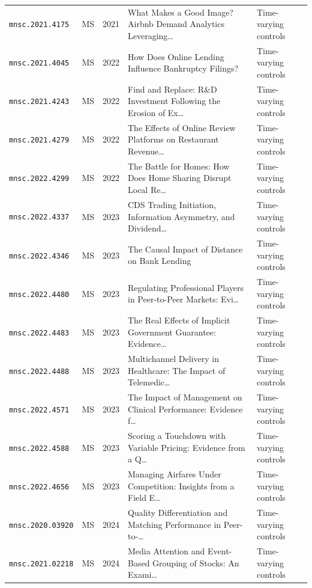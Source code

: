 \begin{longtable}{lccp{}l}
\texttt{mnsc.2021.4175} & MS & 2021 & \raggedright What Makes a Good Image? Airbnb Demand Analytics Leveraging\ldots{} & Time-varying controls \\
\texttt{mnsc.2021.4045} & MS & 2022 & \raggedright How Does Online Lending Influence Bankruptcy Filings? & Time-varying controls \\
\texttt{mnsc.2021.4243} & MS & 2022 & \raggedright Find and Replace: R\&D Investment Following the Erosion of Ex\ldots{} & Time-varying controls \\
\texttt{mnsc.2021.4279} & MS & 2022 & \raggedright The Effects of Online Review Platforms on Restaurant Revenue\ldots{} & Time-varying controls \\
\texttt{mnsc.2022.4299} & MS & 2022 & \raggedright The Battle for Homes: How Does Home Sharing Disrupt Local Re\ldots{} & Time-varying controls \\
\texttt{mnsc.2022.4337} & MS & 2023 & \raggedright CDS Trading Initiation, Information Asymmetry, and Dividend\ldots{} & Time-varying controls \\
\texttt{mnsc.2022.4346} & MS & 2023 & \raggedright The Causal Impact of Distance on Bank Lending & Time-varying controls \\
\texttt{mnsc.2022.4480} & MS & 2023 & \raggedright Regulating Professional Players in Peer-to-Peer Markets: Evi\ldots{} & Time-varying controls \\
\texttt{mnsc.2022.4483} & MS & 2023 & \raggedright The Real Effects of Implicit Government Guarantee: Evidence\ldots{} & Time-varying controls \\
\texttt{mnsc.2022.4488} & MS & 2023 & \raggedright Multichannel Delivery in Healthcare: The Impact of Telemedic\ldots{} & Time-varying controls \\
\texttt{mnsc.2022.4571} & MS & 2023 & \raggedright The Impact of Management on Clinical Performance: Evidence f\ldots{} & Time-varying controls \\
\texttt{mnsc.2022.4588} & MS & 2023 & \raggedright Scoring a Touchdown with Variable Pricing: Evidence from a Q\ldots{} & Time-varying controls \\
\texttt{mnsc.2022.4656} & MS & 2023 & \raggedright Managing Airfares Under Competition: Insights from a Field E\ldots{} & Time-varying controls \\
\texttt{mnsc.2020.03920} & MS & 2024 & \raggedright Quality Differentiation and Matching Performance in Peer-to-\ldots{} & Time-varying controls \\
\texttt{mnsc.2021.02218} & MS & 2024 & \raggedright Media Attention and Event-Based Grouping of Stocks: An Exami\ldots{} & Time-varying controls \\

\end{longtable}
